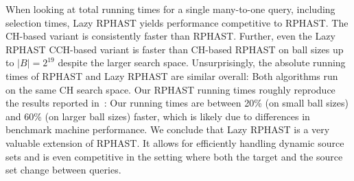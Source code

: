 \documentclass[manuscript]{acmart}
\begin{document}
When looking at total running times for a single many-to-one query, including selection times, Lazy RPHAST yields performance competitive to RPHAST.
The CH-based variant is consistently faster than RPHAST.
Further, even the Lazy RPHAST CCH-based variant is faster than CH-based RPHAST on ball sizes up to $|B| = 2^{19}$ despite the larger search space.
Unsurprisingly, the absolute running times of RPHAST and Lazy RPHAST are similar overall:
Both algorithms run on the same CH search space.
Our RPHAST running times roughly reproduce the results reported in~\cite{delling_et_al:OASIcs:2011:3266}: Our running times are between 20\% (on small ball sizes) and 60\% (on larger ball sizes) faster, which is likely due to differences in benchmark machine performance.
We conclude that Lazy RPHAST is a very valuable extension of RPHAST.
It allows for efficiently handling dynamic source sets and is even competitive in the setting where both the target and the source set change between queries.

\end{document}
